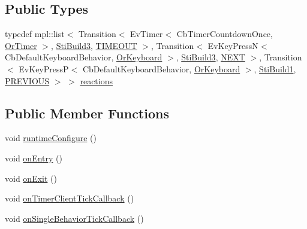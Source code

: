 \subsection*{Public Types}
\begin{DoxyCompactItemize}
\item 
typedef mpl\+::list$<$ Transition$<$ Ev\+Timer$<$ Cb\+Timer\+Countdown\+Once, \hyperlink{classsm__starcraft__ai_1_1OrTimer}{Or\+Timer} $>$, \hyperlink{structsm__starcraft__ai_1_1build__inner__states_1_1StiBuild3}{Sti\+Build3}, \hyperlink{structsm__starcraft__ai_1_1build__inner__states_1_1StiBuild2_1_1TIMEOUT}{T\+I\+M\+E\+O\+UT} $>$, Transition$<$ Ev\+Key\+PressN$<$ Cb\+Default\+Keyboard\+Behavior, \hyperlink{classsm__starcraft__ai_1_1OrKeyboard}{Or\+Keyboard} $>$, \hyperlink{structsm__starcraft__ai_1_1build__inner__states_1_1StiBuild3}{Sti\+Build3}, \hyperlink{structsm__starcraft__ai_1_1build__inner__states_1_1StiBuild2_1_1NEXT}{N\+E\+XT} $>$, Transition$<$ Ev\+Key\+PressP$<$ Cb\+Default\+Keyboard\+Behavior, \hyperlink{classsm__starcraft__ai_1_1OrKeyboard}{Or\+Keyboard} $>$, \hyperlink{structsm__starcraft__ai_1_1build__inner__states_1_1StiBuild1}{Sti\+Build1}, \hyperlink{structsm__starcraft__ai_1_1build__inner__states_1_1StiBuild2_1_1PREVIOUS}{P\+R\+E\+V\+I\+O\+US} $>$ $>$ \hyperlink{structsm__starcraft__ai_1_1build__inner__states_1_1StiBuild2_ab615bc2995682a7a80cdf4d5ddcad22c}{reactions}
\end{DoxyCompactItemize}
\subsection*{Public Member Functions}
\begin{DoxyCompactItemize}
\item 
void \hyperlink{structsm__starcraft__ai_1_1build__inner__states_1_1StiBuild2_a69f6a051fbfd9476762b804fbb06809a}{runtime\+Configure} ()
\item 
void \hyperlink{structsm__starcraft__ai_1_1build__inner__states_1_1StiBuild2_aac67681e26987ca8d4bf57e9e561dae7}{on\+Entry} ()
\item 
void \hyperlink{structsm__starcraft__ai_1_1build__inner__states_1_1StiBuild2_a2b0e97a51cf2a806d5238a54c68cb3f3}{on\+Exit} ()
\item 
void \hyperlink{structsm__starcraft__ai_1_1build__inner__states_1_1StiBuild2_af8ce2f1ad0fafe8a93d9545e312c7710}{on\+Timer\+Client\+Tick\+Callback} ()
\item 
void \hyperlink{structsm__starcraft__ai_1_1build__inner__states_1_1StiBuild2_abd5fb7f89d975b5c15810cba5df7acb5}{on\+Single\+Behavior\+Tick\+Callback} ()
\end{DoxyCompactItemize}
